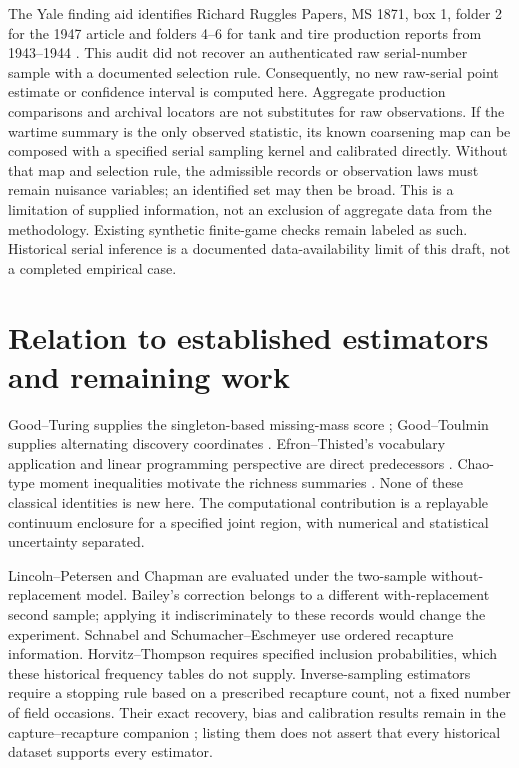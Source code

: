 \documentclass[11pt]{article}
\theoremstyle{remark}\newtheorem{remark}[theorem]{Remark}
\begin{document}
The Yale finding aid identifies Richard Ruggles Papers,
MS 1871, box 1, folder 2 for the 1947 article and folders 4--6 for tank and
tire production reports from 1943--1944 \cite{Yale}. This audit did not recover
an authenticated raw serial-number sample with a documented selection rule.
Consequently, no new raw-serial point estimate or confidence interval is
computed here. Aggregate production comparisons and archival locators are not
substitutes for raw observations. If the wartime summary is the only observed
statistic, its known coarsening map can be composed with a specified serial
sampling kernel and calibrated directly. Without that map and selection rule,
the admissible records or observation laws must remain nuisance variables;
an identified set may then be broad. This is a limitation of supplied
information, not an exclusion of aggregate data from the methodology.
Existing synthetic finite-game checks remain
labeled as such. Historical serial inference is a documented data-availability
limit of this draft, not a completed empirical case.

\section{Relation to established estimators and remaining work}
Good--Turing supplies the singleton-based missing-mass score
\cite{Good1953}; Good--Toulmin supplies alternating discovery coordinates
\cite{GoodToulmin1956}. Efron--Thisted's vocabulary application and linear
programming perspective are direct predecessors \cite{EfronThisted1976}.
Chao-type moment inequalities motivate the richness summaries
\cite{Chao1984,Chao1987}. None of these classical identities is new here.
The computational contribution is a replayable continuum enclosure for a
specified joint region, with numerical and statistical uncertainty separated.

Lincoln--Petersen and Chapman are evaluated under the two-sample
without-replacement model. Bailey's correction belongs to a different
with-replacement second sample; applying it indiscriminately to these records
would change the experiment. Schnabel and Schumacher--Eschmeyer use ordered
recapture information. Horvitz--Thompson requires specified inclusion
probabilities, which these historical frequency tables do not supply.
Inverse-sampling estimators require a stopping rule based on a prescribed
recapture count, not a fixed number of field occasions. Their exact recovery,
bias and calibration results remain in the capture--recapture companion
\cite{LongCapture}; listing them does not assert that every historical dataset
supports every estimator.
\end{document}
